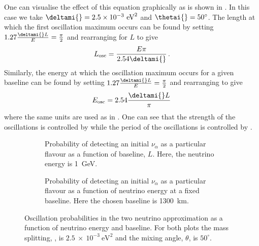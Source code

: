 One can visualise the effect of this equation graphically as is shown in . 
In this case we take $\deltami{} = 2.5 \times 10^{-3}~\text{eV}^{2}$ and $\thetai{} = 50^{\circ}$.
The length at which the first oscillation maximum occurs can be found by setting $1.27 \frac{\deltami{}L}{E} = \frac{\pi}{2}$ and rearranging for $L$ to give
\begin{equation}
  L_{\text{osc}} = \frac{E \pi}{2.54 \deltami{}} \, .
\end{equation}
Similarly, the energy at which the oscillation maximum occurs for a given baseline can be found by setting $1.27 \frac{\deltami{}L}{E} = \frac{\pi}{2}$ and rearranging to give
\begin{equation}
  E_{\text{osc}} = 2.54 \frac{\deltami{} L}{\pi} \,
\end{equation}
where the same units are used as in .
One can see that the strength of the oscillations is controlled by \sstwothetai{} while the period of the oscillations is controlled by \deltami{}.

\begin{figure}[h]
  \centering
  \begin{subfigure}[t]{0.49\textwidth}
    \begin{adjustbox}{max totalsize={\textwidth}, center}
      
    \end{adjustbox}
    \caption{Probability of detecting an initial $\nu_{\alpha}$ as a particular flavour as a function of baseline, $L$. Here, the neutrino energy is \SI{1}{\GeV}.}
  \end{subfigure}
  \hfill
  \begin{subfigure}[t]{0.49\textwidth}
    \begin{adjustbox}{max totalsize={\textwidth}, center}
      
    \end{adjustbox}
    \caption{Probability of detecting an initial $\nu_{\alpha}$ as a particular flavour as a function of neutrino energy at a fixed baseline. Here the chosen baseline is 1300~km.}
  \end{subfigure}
  \caption[Two neutrino vacuum oscillation probabilities.]{Oscillation probabilities in the two neutrino approximation as a function of neutrino energy and baseline. For both plots the mass splitting, \deltami{}, is $2.5~\times~10^{-3}~\text{eV}^{2}$ and the mixing angle, $\theta$, is $50^{\circ}$.}
  \label{fig:twoNeutrino}
\end{figure}

